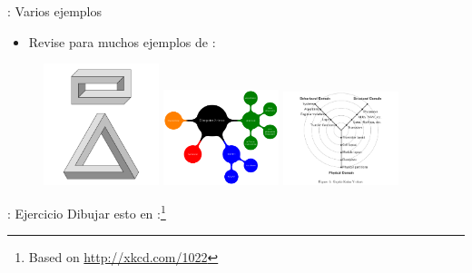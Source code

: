 \documentclass{beamer}
\begin{document}
\begin{frame}[fragile]{\insertsection: Varios ejemplos}
  \begin{itemize}
  \item Revise
     para
    muchos ejemplos de \tikzname{}:
  \end{itemize}
  \begin{figure}
    \href{http://texample.net/tikz/examples/escher-brick-penrose-triangle/}{%
      \includegraphics[width=0.3\textwidth]{escher-brick-penrose-triangle}}
    \href{http://texample.net/tikz/examples/computer-science-mindmap/}{%
      \includegraphics[width=0.3\textwidth]{computer-science-mindmap}}
    \href{http://texample.net/tikz/examples/gajski-kuhn-y-chart/}{%
      \includegraphics[width=0.3\textwidth]{gajski-kuhn-y-chart}}
  \end{figure}
\end{frame}

\begin{frame}[fragile]{\insertsection: Ejercicio}
  Dibujar esto en \tikzname:\footnote{Based on \url{http://xkcd.com/1022}}
  \begin{figure}
    
  \end{figure}
\end{frame}
\end{document}
